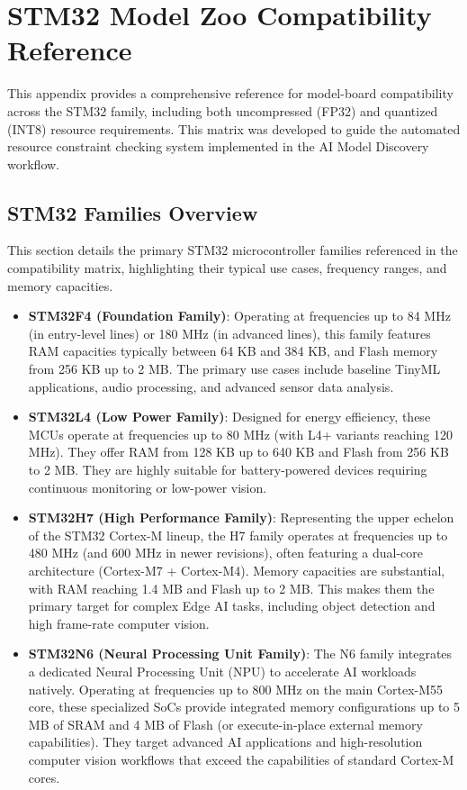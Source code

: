 \appendix

\chapter{STM32 Model Zoo Compatibility Reference}
\label{app:model_compat_full}

This appendix provides a comprehensive reference for model-board compatibility across the STM32 family, including both uncompressed (FP32) and quantized (INT8) resource requirements. This matrix was developed to guide the automated resource constraint checking system implemented in the AI Model Discovery workflow.

\section{STM32 Families Overview}

This section details the primary STM32 microcontroller families referenced in the compatibility matrix, highlighting their typical use cases, frequency ranges, and memory capacities.

\begin{itemize}
    \item \textbf{STM32F4 (Foundation Family)}: Operating at frequencies up to 84 MHz (in entry-level lines) or 180 MHz (in advanced lines), this family features RAM capacities typically between 64 KB and 384 KB, and Flash memory from 256 KB up to 2 MB. The primary use cases include baseline TinyML applications, audio processing, and advanced sensor data analysis. 
    
    \item \textbf{STM32L4 (Low Power Family)}: Designed for energy efficiency, these MCUs operate at frequencies up to 80 MHz (with L4+ variants reaching 120 MHz). They offer RAM from 128 KB up to 640 KB and Flash from 256 KB to 2 MB. They are highly suitable for battery-powered devices requiring continuous monitoring or low-power vision. 
    
    \item \textbf{STM32H7 (High Performance Family)}: Representing the upper echelon of the STM32 Cortex-M lineup, the H7 family operates at frequencies up to 480 MHz (and 600 MHz in newer revisions), often featuring a dual-core architecture (Cortex-M7 + Cortex-M4). Memory capacities are substantial, with RAM reaching 1.4 MB and Flash up to 2 MB. This makes them the primary target for complex Edge AI tasks, including object detection and high frame-rate computer vision. 
    
    \item \textbf{STM32N6 (Neural Processing Unit Family)}: The N6 family integrates a dedicated Neural Processing Unit (NPU) to accelerate AI workloads natively. Operating at frequencies up to 800 MHz on the main Cortex-M55 core, these specialized SoCs provide integrated memory configurations up to 5 MB of SRAM and 4 MB of Flash (or execute-in-place external memory capabilities). They target advanced AI applications and high-resolution computer vision workflows that exceed the capabilities of standard Cortex-M cores.
\end{itemize}


